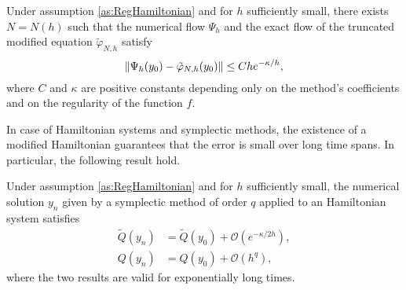 \documentclass{siamart1116}
\numberwithin{theorem}{section}
\DeclarePairedDelimiter{\norm}{\|}{\|}
\renewcommand{\phi}{\varphi}
\newcommand{\OO}{\mathcal{O}}
\begin{document}
\begin{lemma}\label{lem:LocalHamiltonianDet} Under assumption \ref{as:RegHamiltonian} and for $h$ sufficiently small, there exists $N = N(h)$ such that the numerical flow $\Psi_h$ and the exact flow of the truncated modified equation $\tilde \phi_{N, h}$ satisfy
	\begin{equation}
	\norm{\Psi_h(y_0) - \tilde \phi_{N, h}(y_0)} \leq C h e^{-\kappa / h},
	\end{equation}
	where $C$ and $\kappa$ are positive constants depending only on the method's coefficients and on the regularity of the function $f$.
\end{lemma}

In case of Hamiltonian systems and symplectic methods, the existence of a modified Hamiltonian guarantees that the error is small over long time spans. In particular, the following result hold.

\begin{theorem} Under assumption \ref{as:RegHamiltonian} and for $h$ sufficiently small, the numerical solution $y_n$ given by a symplectic method of order $q$ applied to an Hamiltonian system satisfies
	\begin{align}
		\tilde Q(y_n) &= \tilde Q (y_0) + \OO(e^{-\kappa / 2h}), \\
		Q(y_n) &= Q(y_0) + \OO(h^q),
	\end{align}
	where the two results are valid for exponentially long times.
\end{theorem}
\end{document}
